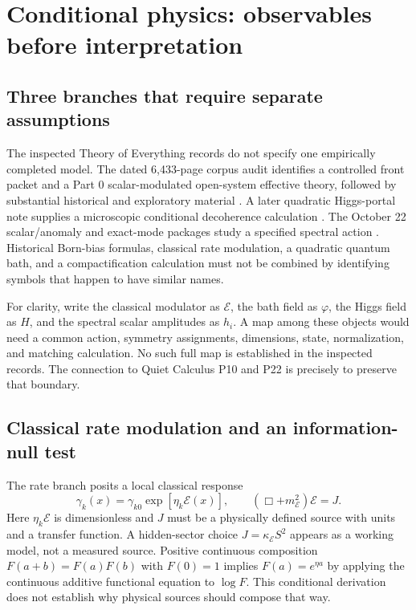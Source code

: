 \clearpage
\section{Conditional physics: observables before interpretation}
\label{sec:physics}
\subsection{Three branches that require separate assumptions}
The inspected Theory of Everything records do not specify one empirically completed model. The dated 6,433-page corpus audit identifies a controlled front packet and a Part 0 scalar-modulated open-system effective theory, followed by substantial historical and exploratory material \cite{toeaudit}. A later quadratic Higgs-portal note supplies a microscopic conditional decoherence calculation \cite{portal}. The October 22 scalar/anomaly and exact-mode packages study a specified spectral action \cite{scalar,exact}. Historical Born-bias formulas, classical rate modulation, a quadratic quantum bath, and a compactification calculation must not be combined by identifying symbols that happen to have similar names.

For clarity, write the classical modulator as $\mathcal E$, the bath field as $\varphi$, the Higgs field as $H$, and the spectral scalar amplitudes as $h_i$. A map among these objects would need a common action, symmetry assignments, dimensions, state, normalization, and matching calculation. No such full map is established in the inspected records. The connection to Quiet Calculus P10 and P22 is precisely to preserve that boundary.

\subsection{Classical rate modulation and an information-null test}
The rate branch posits a local classical response
\begin{equation}
 \gamma_k(x)=\gamma_{k0}\exp[\eta_k\mathcal E(x)],\qquad
 (\Box+m_{\mathcal E}^{2})\mathcal E=J.
 \label{eq:rate}
\end{equation}
Here $\eta_k\mathcal E$ is dimensionless and $J$ must be a physically defined source with units and a transfer function. A hidden-sector choice $J=\kappa_{\mathcal E}S^2$ appears as a working model, not a measured source. Positive continuous composition $F(a+b)=F(a)F(b)$ with $F(0)=1$ implies $F(a)=e^{\eta a}$ by applying the continuous additive functional equation to $\log F$. This conditional derivation does not establish why physical sources should compose that way.

